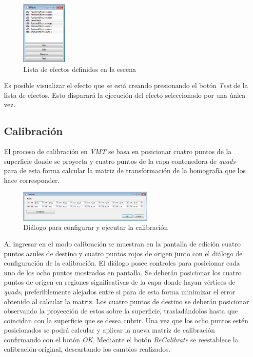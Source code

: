 \begin{figure}[H]
  \centering
    \includegraphics[width=0.2\textwidth]{./Cap5_vmt/vmt_Efects.png}
  \caption[Imagen propia.]{Lista de efectos definidos en la escena}
  \label{fig:VMT-EffectList}
\end{figure}

Es posible visualizar el efecto que se está creando presionando el botón \emph{Test} de la lista de efectos. Esto disparará la ejecución del efecto seleccionado por una única vez.

\subsection{Calibración}

El proceso de calibración en \emph{VMT} se basa en posicionar cuatro puntos de la superficie donde se proyecta y cuatro puntos de la capa contenedora de \emph{quads} para de esta forma calcular la matriz de transformación de la homografía que los hace corresponder.

\begin{figure}[H]
  \centering
    \includegraphics[width=0.6\textwidth]{./Cap5_vmt/vmt_Calibrate.png}
  \caption[Imagen propia.]{Diálogo para configurar y ejecutar la calibración}
  \label{fig:VMT-Calib}
\end{figure}

Al ingresar en el modo calibración se muestran en la pantalla de edición cuatro puntos azules de destino y cuatro puntos rojos de origen junto con el diálogo de configuración de la calibración.
El diálogo posee controles para posicionar cada uno de los ocho puntos mostrados en pantalla. Se deberán posicionar los cuatro puntos de origen en regiones significativas de la capa donde hayan vértices de \emph{quads}, preferiblemente alejados entre si para de esta forma minimizar el error obtenido al calcular la matriz.
Los cuatro puntos de destino se deberán posicionar observando la proyección de estos sobre la superficie, trasladándolos hasta que coincidan con la superficie que se desea cubrir. Una vez que los ocho puntos estén posicionados se podrá calcular y aplicar la nueva matriz de calibración confirmando con el botón \emph{OK}.
Mediante el botón \emph{ReCalibrate} se reestablece la calibración original, descartando los cambios realizados.

